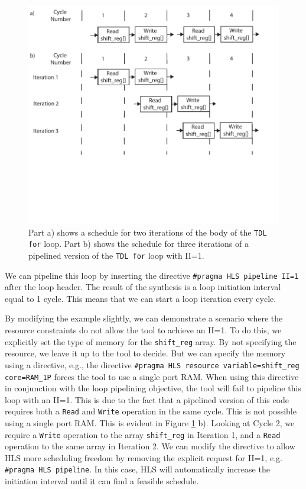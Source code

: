 \begin{figure}
\centering
\includegraphics[width=6in]{images/pipeline_tdl}
\caption{Part a) shows a schedule for two iterations of the body of the \lstinline{TDL for} loop. Part b) shows the schedule for three iterations of a pipelined version of the \lstinline{TDL for} loop with II=1.}
\label{fig:pipeline_tdl}
\end{figure}

We can pipeline this loop by inserting the directive \lstinline{#pragma HLS pipeline II=1} after the loop header. The result of the synthesis is a loop initiation interval equal to 1 cycle.  This means that we can start a loop iteration every cycle. 

By modifying the example slightly, we can demonstrate a scenario where the resource constraints do not allow the \VHLS tool to achieve an II=1. To do this, we explicitly set the type of memory for the \lstinline{shift_reg} array. By not specifying the resource, we leave it up to the \VHLS tool to decide. But we can specify the memory using a directive, e.g., the directive \lstinline{#pragma HLS resource variable=shift_reg core=RAM_1P} forces the \VHLS tool to use a single port RAM. When using this directive in conjunction with the loop pipelining objective, the \VHLS tool will fail to pipeline this loop with an II=1. This is due to the fact that a pipelined version of this code requires both a \lstinline{Read} and \lstinline{Write} operation in the same cycle. This is not possible using a single port RAM. This is evident in Figure \ref{fig:pipeline_tdl} b). Looking at Cycle 2, we require a \lstinline{Write} operation to the array \lstinline{shift_reg} in Iteration 1, and a \lstinline{Read} operation to the same array in Iteration 2.  We can modify the directive to allow HLS more scheduling freedom by removing the explicit request for II=1, e.g. \lstinline{#pragma HLS pipeline}.  In this case, HLS will automatically increase the initiation interval until it can find a feasible schedule.

